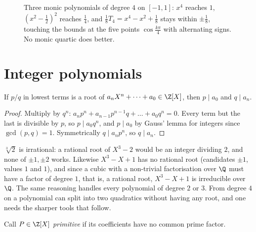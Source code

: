\begin{figure}[ht]
\centering
{}
\caption{Three monic polynomials of degree $4$ on $[-1,1]$: $x^4$ reaches $1$, $(x^2-\frac12)^2$ reaches $\frac14$, and $\frac18T_4=x^4-x^2+\frac18$ stays within $\pm\frac18$, touching the bounds at the five points $\cos\frac{k\pi}4$ with alternating signs. No monic quartic does better.}
\label{fig:equioscillation}
\end{figure}

\section{Integer polynomials}

\begin{proposition}\label{prop:ratroot}
If $p/q$ in lowest terms is a root of $a_nX^n+\dots+a_0\in\Z[X]$, then $p\mid a_0$ and $q\mid a_n$.
\end{proposition}
\begin{proof}
Multiply by $q^n$: $a_np^n+a_{n-1}p^{n-1}q+\dots+a_0q^n=0$. Every term but the last is divisible by $p$, so $p\mid a_0q^n$, and $p\mid a_0$ by Gauss' lemma for integers since $\gcd(p,q)=1$. Symmetrically $q\mid a_np^n$, so $q\mid a_n$.
\end{proof}

\begin{examplex}
$\sqrt[3]2$ is irrational: a rational root of $X^3-2$ would be an integer dividing $2$, and none of $\pm1,\pm2$ works. Likewise $X^3-X+1$ has no
rational root (candidates $\pm1$, values $1$ and $1$), and since a cubic with a non-trivial factorisation over $\Q$ must have a factor of degree $1$,
that is, a rational root, $X^3-X+1$ is irreducible over $\Q$. The same reasoning handles every polynomial of degree $2$ or $3$. From degree $4$ on a
polynomial can split into two quadratics without having any root, and one needs the sharper tools that follow.
\end{examplex}

Call $P\in\Z[X]$ \emph{primitive} if its coefficients have no common prime factor.


